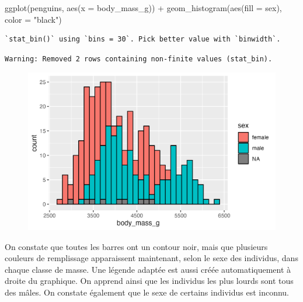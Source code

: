 \documentclass[
  letterpaper,
  DIV=11,
  numbers=noendperiod]{scrreprt}
\newenvironment{Shaded}{\begin{snugshade}}{\end{snugshade}}
\newcommand{\AttributeTok}[1]{\textcolor[rgb]{0.40,0.45,0.13}{#1}}
\newcommand{\FunctionTok}[1]{\textcolor[rgb]{0.28,0.35,0.67}{#1}}
\newcommand{\NormalTok}[1]{\textcolor[rgb]{0.00,0.23,0.31}{#1}}
\newcommand{\SpecialCharTok}[1]{\textcolor[rgb]{0.37,0.37,0.37}{#1}}
\newcommand{\StringTok}[1]{\textcolor[rgb]{0.13,0.47,0.30}{#1}}
\begin{document}
\begin{Shaded}
\begin{Highlighting}[]
\FunctionTok{ggplot}\NormalTok{(penguins, }\FunctionTok{aes}\NormalTok{(}\AttributeTok{x =}\NormalTok{ body\_mass\_g)) }\SpecialCharTok{+}
  \FunctionTok{geom\_histogram}\NormalTok{(}\FunctionTok{aes}\NormalTok{(}\AttributeTok{fill =}\NormalTok{ sex), }\AttributeTok{color =} \StringTok{"black"}\NormalTok{)}
\end{Highlighting}
\end{Shaded}

\begin{verbatim}
`stat_bin()` using `bins = 30`. Pick better value with `binwidth`.
\end{verbatim}

\begin{verbatim}
Warning: Removed 2 rows containing non-finite values (stat_bin).
\end{verbatim}

\begin{figure}[H]

{\centering \includegraphics{./03-visualization_files/figure-pdf/unnamed-chunk-12-1.png}

}

\end{figure}

On constate que toutes les barres ont un contour noir, mais que
plusieurs couleurs de remplissage apparaissent maintenant, selon le sexe
des individus, dans chaque classe de masse. Une légende adaptée est
aussi créée automatiquement à droite du graphique. On apprend ainsi que
les individus les plus lourds sont tous des mâles. On constate également
que le sexe de certains individus est inconnu.
\end{document}
